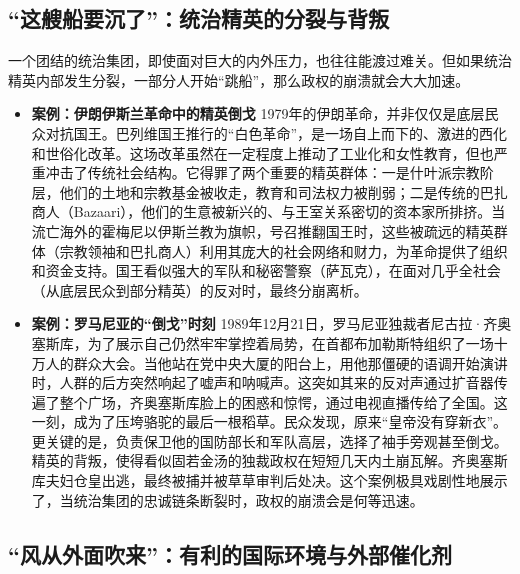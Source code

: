 \subsection{“这艘船要沉了”：统治精英的分裂与背叛}

一个团结的统治集团，即使面对巨大的内外压力，也往往能渡过难关。但如果统治精英内部发生分裂，一部分人开始“跳船”，那么政权的崩溃就会大大加速。
\begin{itemize}
\item \textbf{案例：伊朗伊斯兰革命中的精英倒戈}
    1979年的伊朗革命，并非仅仅是底层民众对抗国王。巴列维国王推行的“白色革命”，是一场自上而下的、激进的西化和世俗化改革。这场改革虽然在一定程度上推动了工业化和女性教育，但也严重冲击了传统社会结构。它得罪了两个重要的精英群体：一是什叶派宗教阶层，他们的土地和宗教基金被收走，教育和司法权力被削弱；二是传统的巴扎商人（Bazaari），他们的生意被新兴的、与王室关系密切的资本家所排挤。当流亡海外的霍梅尼以伊斯兰教为旗帜，号召推翻国王时，这些被疏远的精英群体（宗教领袖和巴扎商人）利用其庞大的社会网络和财力，为革命提供了组织和资金支持。国王看似强大的军队和秘密警察（萨瓦克），在面对几乎全社会（从底层民众到部分精英）的反对时，最终分崩离析。
\item \textbf{案例：罗马尼亚的“倒戈”时刻}
    1989年12月21日，罗马尼亚独裁者尼古拉·齐奥塞斯库，为了展示自己仍然牢牢掌控着局势，在首都布加勒斯特组织了一场十万人的群众大会。当他站在党中央大厦的阳台上，用他那僵硬的语调开始演讲时，人群的后方突然响起了嘘声和呐喊声。这突如其来的反对声通过扩音器传遍了整个广场，齐奥塞斯库脸上的困惑和惊愕，通过电视直播传给了全国。这一刻，成为了压垮骆驼的最后一根稻草。民众发现，原来“皇帝没有穿新衣”。更关键的是，负责保卫他的国防部长和军队高层，选择了袖手旁观甚至倒戈。精英的背叛，使得看似固若金汤的独裁政权在短短几天内土崩瓦解。齐奥塞斯库夫妇仓皇出逃，最终被捕并被草草审判后处决。这个案例极具戏剧性地展示了，当统治集团的忠诚链条断裂时，政权的崩溃会是何等迅速。
\end{itemize}

\subsection{“风从外面吹来”：有利的国际环境与外部催化剂}

